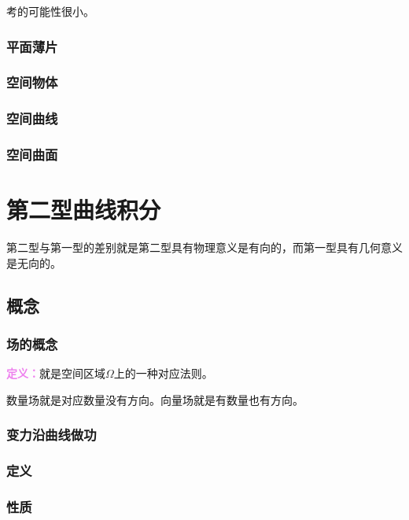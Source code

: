 \documentclass[UTF8, 12pt]{ctexart}
\begin{document}
考的可能性很小。

\subsubsection{平面薄片}

\subsubsection{空间物体}

\subsubsection{空间曲线}

\subsubsection{空间曲面}

\section{第二型曲线积分}

第二型与第一型的差别就是第二型具有物理意义是有向的，而第一型具有几何意义是无向的。

\subsection{概念}

\subsubsection{场的概念}

\textcolor{violet}{\textbf{定义：}}就是空间区域$\Omega$上的一种对应法则。

数量场就是对应数量没有方向。向量场就是有数量也有方向。

\subsubsection{变力沿曲线做功}

\subsubsection{定义}

\subsubsection{性质}
\end{document}
